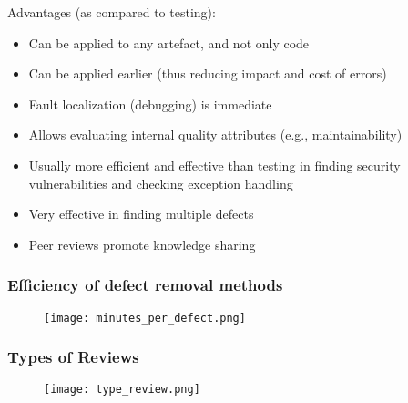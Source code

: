 \documentclass[../ESOF_notes.tex]{subfiles}
\begin{document}
Advantages (as compared to testing): 
\begin{itemize}
    \item Can be applied to any artefact, and not only code
    \item Can be applied earlier (thus reducing impact and cost of errors)
    \item Fault localization (debugging) is immediate
    \item Allows evaluating internal quality attributes (e.g., maintainability)
    \item Usually more efficient and effective than testing in finding security
          vulnerabilities and checking exception handling
    \item Very effective in finding multiple defects
    \item Peer reviews promote knowledge sharing
\end{itemize}

\subsubsection{Efficiency of defect removal methods}
\begin{figure}[h!]
    \centering
    \texttt{[image: minutes\_per\_defect.png]}
\end{figure}
\pagebreak
\subsubsection{Types of Reviews}
\begin{figure}[h!]
    \centering
    \texttt{[image: type\_review.png]}
\end{figure}
\end{document}
